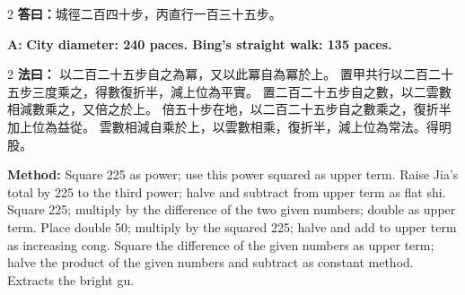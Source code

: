 \documentclass[11pt,a4paper]{article}
\newcommand{\fayue}[1]{%
  \noindent\textcolor{methodcolor}{\textbf{法曰：}}{\tradfont #1}\par\nopagebreak%
}
\newcommand{\fayueeng}[1]{%
  \noindent\textcolor{engcolor}{\textbf{Method: }}{#1}\par\nopagebreak%
}
\newcommand{\dayue}[1]{%
  \noindent\textcolor{anscolor}{\textbf{答曰：}}{\tradfont #1}\par\nopagebreak%
}
\newcommand{\dayueeng}[1]{%
  \noindent\textcolor{engcolor}{\textbf{A: }}{\bfseries #1}\par\nopagebreak%
}
\begin{document}
\begin{paracol}{2}
\dayue{城徑二百四十步，丙直行一百三十五步。}
\switchcolumn
\dayueeng{City diameter: 240 paces. Bing's straight walk: 135 paces.}
\end{paracol}

\begin{paracol}{2}
\fayue{%
以二百二十五步自之為冪，又以此冪自為冪於上。
置甲共行以二百二十五步三度乘之，得數復折半，減上位為平實。
置二百二十五步自之數，以二雲數相減數乘之，又倍之於上。
倍五十步在地，以二百二十五步自之數乘之，復折半加上位為益從。
雲數相減自乘於上，以雲數相乘，復折半，減上位為常法。得明股。}
\switchcolumn
\fayueeng{%
Square 225 as power; use this power squared as upper term. Raise Jia's total by 225 to the third power; halve and subtract from upper term as flat shi. Square 225; multiply by the difference of the two given numbers; double as upper term. Place double 50; multiply by the squared 225; halve and add to upper term as increasing cong. Square the difference of the given numbers as upper term; halve the product of the given numbers and subtract as constant method. Extracts the bright gu.}
\end{paracol}
\end{document}

